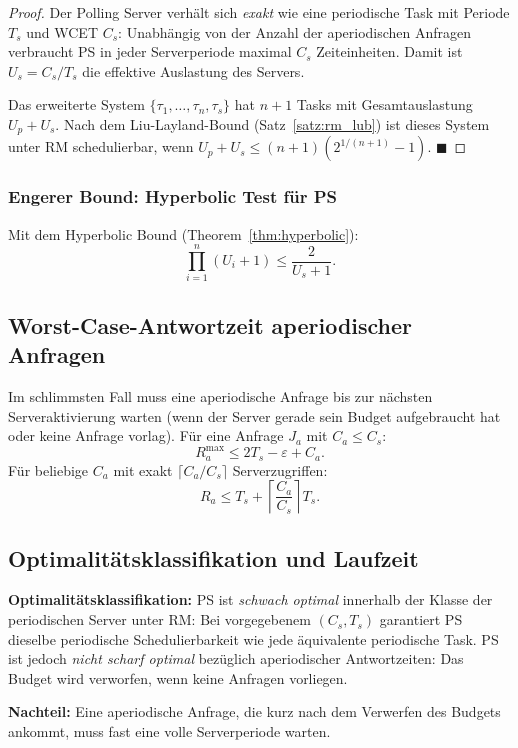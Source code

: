 ﻿\documentclass[a4paper,12pt]{report}
\theoremstyle{definition}
\begin{document}
\begin{proof}
	Der Polling Server verhält sich \emph{exakt} wie eine periodische Task mit
	Periode $T_s$ und WCET $C_s$: Unabhängig von der Anzahl der aperiodischen
	Anfragen verbraucht PS in jeder Serverperiode maximal $C_s$ Zeiteinheiten.
	Damit ist $U_s = C_s/T_s$ die effektive Auslastung des Servers.

	Das erweiterte System $\{\tau_1,\ldots,\tau_n, \tau_s\}$ hat $n+1$ Tasks
	mit Gesamtauslastung $U_p + U_s$. Nach dem Liu-Layland-Bound (Satz~\ref{satz:rm_lub})
	ist dieses System unter RM schedulierbar, wenn
	$U_p + U_s \leq (n+1)(2^{1/(n+1)}-1)$. \hfill$\blacksquare$
\end{proof}

\subsubsection{Engerer Bound: Hyperbolic Test für PS}

Mit dem Hyperbolic Bound (Theorem~\ref{thm:hyperbolic}):
\[
	\prod_{i=1}^{n}(U_i + 1) \leq \frac{2}{U_s + 1}.
\]

\subsection{Worst-Case-Antwortzeit aperiodischer Anfragen}

Im schlimmsten Fall muss eine aperiodische Anfrage bis zur nächsten Serveraktivierung
warten (wenn der Server gerade sein Budget aufgebraucht hat oder keine Anfrage
vorlag). Für eine Anfrage $J_a$ mit $C_a \leq C_s$:
\[
	R_a^{\max} \leq 2T_s - \varepsilon + C_a.
\]
Für beliebige $C_a$ mit exakt $\lceil C_a/C_s \rceil$ Serverzugriffen:
\[
	R_a \leq T_s + \left\lceil \frac{C_a}{C_s} \right\rceil T_s.
\]

\subsection{Optimalitätsklassifikation und Laufzeit}

\textbf{Optimalitätsklassifikation:} PS ist \emph{schwach optimal} innerhalb
der Klasse der periodischen Server unter RM: Bei vorgegebenem $(C_s, T_s)$
garantiert PS dieselbe periodische Schedulierbarkeit wie jede äquivalente
periodische Task. PS ist jedoch \emph{nicht scharf optimal} bezüglich aperiodischer
Antwortzeiten: Das Budget wird verworfen, wenn keine Anfragen vorliegen.

\textbf{Nachteil:} Eine aperiodische Anfrage, die kurz nach dem Verwerfen des
Budgets ankommt, muss fast eine volle Serverperiode warten.
\end{document}
